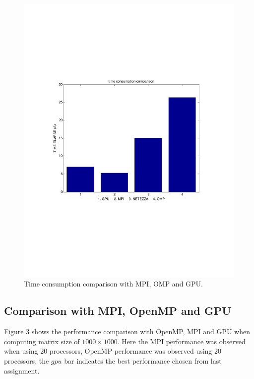 \documentclass {article}
\begin{document}
\begin{figure}[hbp!]
\centering
\includegraphics[width = \linewidth]{3.pdf}
\caption{Time consumption comparison with MPI, OMP and GPU.}
\label{fig:one}
\end{figure}



\subsection{Comparison with MPI, OpenMP and GPU}
Figure 3 shows the performance comparison with OpenMP, MPI and GPU when computing matrix size of $1000 \times 1000$. Here the MPI performance was observed when using 20 processors, OpenMP performance was observed using 20 processors, the $gpu$ bar indicates the best performance chosen from last assignment. 
\end{document}
